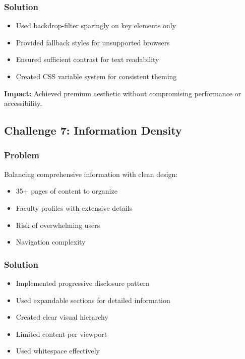 \documentclass[12pt,a4paper]{report}
\begin{document}
\subsubsection*{Solution}
\begin{itemize}
    \item Used backdrop-filter sparingly on key elements only
    \item Provided fallback styles for unsupported browsers
    \item Ensured sufficient contrast for text readability
    \item Created CSS variable system for consistent theming
\end{itemize}

\textbf{Impact:} Achieved premium aesthetic without compromising performance or accessibility.

\subsection{Challenge 7: Information Density}

\subsubsection*{Problem}
Balancing comprehensive information with clean design:
\begin{itemize}
    \item 35+ pages of content to organize
    \item Faculty profiles with extensive details
    \item Risk of overwhelming users
    \item Navigation complexity
\end{itemize}

\subsubsection*{Solution}
\begin{itemize}
    \item Implemented progressive disclosure pattern
    \item Used expandable sections for detailed information
    \item Created clear visual hierarchy
    \item Limited content per viewport
    \item Used whitespace effectively
\end{itemize}
\end{document}
